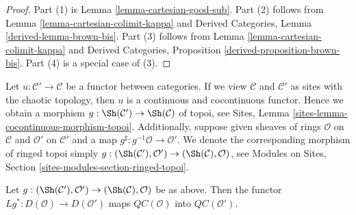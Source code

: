 \begin{proof}
Part (1) is Lemma \ref{lemma-cartesian-good-sub}.
Part (2) follows from Lemma \ref{lemma-cartesian-colimit-kappa} and
Derived Categories, Lemma \ref{derived-lemma-brown-bis}.
Part (3) follows from
Lemma \ref{lemma-cartesian-colimit-kappa} and
Derived Categories, Proposition \ref{derived-proposition-brown-bis}.
Part (4) is a special case of (3).
\end{proof}

\noindent
Let $u : \mathcal{C}' \to \mathcal{C}$ be a functor between categories.
If we view $\mathcal{C}$ and $\mathcal{C}'$ as sites with the chaotic
topology, then $u$ is a continuous and cocontinuous functor. Hence
we obtain a morphism $g : \Sh(\mathcal{C}') \to \Sh(\mathcal{C})$
of topoi, see Sites, Lemma \ref{sites-lemma-cocontinuous-morphism-topoi}.
Additionally, suppose given sheaves of rings $\mathcal{O}$ on $\mathcal{C}$
and $\mathcal{O}'$ on $\mathcal{C}'$ and a map
$g^\sharp : g^{-1}\mathcal{O} \to \mathcal{O}'$.
We denote the corresponding morphism of ringed topoi simply
$g : (\Sh(\mathcal{C}'), \mathcal{O}') \to (\Sh(\mathcal{C}), \mathcal{O})$,
see Modules on Sites, Section \ref{sites-modules-section-ringed-topoi}.

\begin{lemma}
\label{lemma-cartesian-functorial}
Let $g : (\Sh(\mathcal{C}'), \mathcal{O}') \to (\Sh(\mathcal{C}), \mathcal{O})$
be as above. Then the functor $Lg^* : D(\mathcal{O}) \to D(\mathcal{O}')$
maps $\mathit{QC}(\mathcal{O})$ into $\mathit{QC}(\mathcal{O}')$.
\end{lemma}


